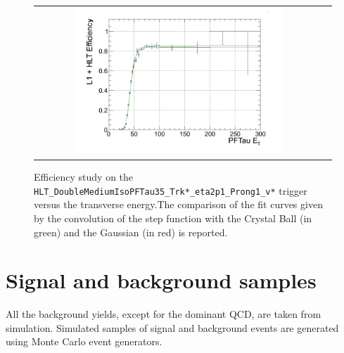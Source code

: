  	\begin{figure}[tbh!]
	\centering
	\begin{tabular}{cc}
		\includegraphics[width=0.75\textwidth]{analysis/pics/trigger_turnon.png}
	\end{tabular}
	\caption{Efficiency study on the \texttt{HLT\_\-DoubleMedium\-IsoPFTau35\_\-Trk*\_\-eta2p1\_\-Prong1\_\-v*} trigger versus the \hadtau transverse energy.The comparison of the fit curves given by the convolution of the step function with the Crystal Ball (in green) and the Gaussian (in red) is reported\cite{bib:dthesis:riccardoManzoni}.}
	\label{fig::trigger_turnon}
\end{figure}

\section{Signal and background samples}
\FloatBarrier



All the background yields, except for the dominant QCD, are taken from simulation. Simulated samples of signal and background events are generated using Monte Carlo event generators.

